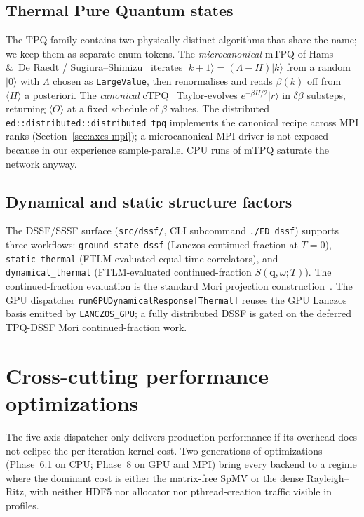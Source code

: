 \documentclass[submission, PhysCodeb]{SciPost}
\begin{document}
\subsection{Thermal Pure Quantum states}
The TPQ family contains two physically distinct algorithms that share
the name; we keep them as separate enum tokens. The
\emph{microcanonical} mTPQ of Hams \&\ De Raedt /
Sugiura--Shimizu~\cite{Hams2000mTPQ,Sugiura2012mTPQ} iterates
$|k+1\rangle = (\Lambda - H) |k\rangle$ from a random $|0\rangle$
with $\Lambda$ chosen as \texttt{LargeValue}, then renormalises and
reads $\beta(k)$ off from $\langle H \rangle$ a posteriori. The
\emph{canonical} cTPQ~\cite{Sugiura2013cTPQ} Taylor-evolves
$e^{-\beta H/2}|r\rangle$ in $\delta\beta$ substeps, returning
$\langle O \rangle$ at a fixed schedule of $\beta$ values. The
distributed \texttt{ed::distributed::distributed\_tpq} implements
the canonical recipe across MPI ranks (Section~\ref{sec:axes-mpi}); a
microcanonical MPI driver is not exposed because in our experience
sample-parallel CPU runs of mTPQ saturate the network anyway.

\subsection{Dynamical and static structure factors}
The DSSF/SSSF surface (\texttt{src/dssf/}, CLI subcommand
\texttt{./ED dssf}) supports three workflows:
\texttt{ground\_state\_dssf} (Lanczos continued-fraction at $T=0$),
\texttt{static\_thermal} (FTLM-evaluated equal-time correlators),
and \texttt{dynamical\_thermal} (FTLM-evaluated continued-fraction
$S(\mathbf{q},\omega; T)$). The continued-fraction evaluation is the
standard Mori projection construction~\cite{Mori1965,Dagotto1994Review}.
The GPU dispatcher \texttt{runGPUDynamicalResponse[Thermal]} reuses
the GPU Lanczos basis emitted by \texttt{LANCZOS\_GPU}; a fully
distributed DSSF is gated on the deferred TPQ-DSSF Mori
continued-fraction work.

\section{Cross-cutting performance optimizations}
\label{sec:perf}
\label{sec:performance}

The five-axis dispatcher only delivers production performance if its
overhead does not eclipse the per-iteration kernel cost. Two
generations of optimizations (Phase~6.1 on CPU; Phase~8 on GPU and
MPI) bring every backend to a regime where the dominant cost is
either the matrix-free SpMV or the dense Rayleigh--Ritz, with neither
HDF5 nor allocator nor pthread-creation traffic visible in profiles.
\end{document}
